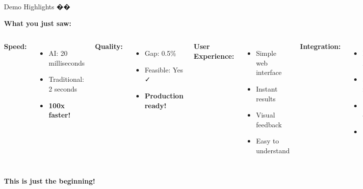 \documentclass[aspectratio=169]{beamer}
\begin{document}
\begin{frame}{Demo Highlights ��}
\begin{center}
\textbf{What you just saw:}
\end{center}

\vspace{0.3cm}

\begin{columns}
\textbf{Speed:}
\begin{itemize}
    \item AI: 20 milliseconds
    \item Traditional: 2 seconds
    \item \textcolor{aigreen}{\textbf{100x faster!}}
\end{itemize}

\vspace{0.3cm}
\textbf{Quality:}
\begin{itemize}
    \item Gap: 0.5\%
    \item Feasible: Yes ✓
    \item \textcolor{aigreen}{\textbf{Production ready!}}
\end{itemize}

\textbf{User Experience:}
\begin{itemize}
    \item Simple web interface
    \item Instant results
    \item Visual feedback
    \item Easy to understand
\end{itemize}

\vspace{0.3cm}
\textbf{Integration:}
\begin{itemize}
    \item REST API ready
    \item JSON format
    \item Cloud deployable
    \item Scalable
\end{itemize}
\end{columns}

\vspace{0.5cm}
\begin{center}
\textcolor{aiblue}{\Large \textbf{This is just the beginning!}}
\end{center}
\end{frame}
\end{document}
